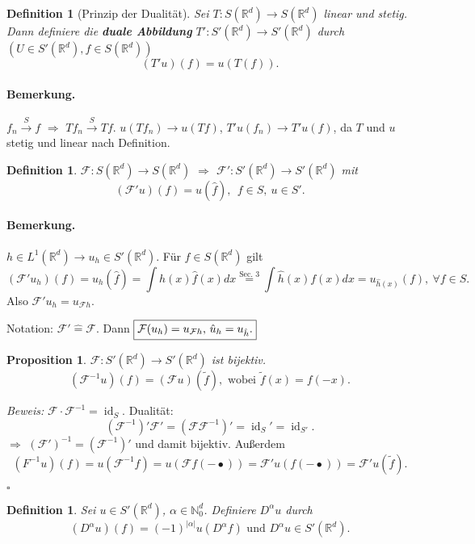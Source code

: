 \documentclass[12pt,a4paper,titlepage]{scrartcl}
\newtheorem{Definition}[Satz]{Definition}
\newtheorem{Prop}[Satz]{Proposition}
\DeclareMathOperator{\id}{id}
\numberwithin{equation}{section}
\newcommand{\R}{\mathbb{R}} %
\newcommand{\N}{\mathbb{N}} %
\newcommand{\f}{\hat{f}}
\newcommand{\F}{\mathcal{F}}
\newcommand{\m}{\cdot}
\newcommand{\Bew}{\emph{Beweis: }}
\newcommand{\qed}{\begin{flushright}
		$\square$
	\end{flushright}}
\begin{document}
	\begin{Definition}[Prinzip der Dualität]
		Sei $T:S(\R^d)\rightarrow S(\R^d)$ linear und stetig. Dann definiere die \textbf{duale Abbildung} $T':S'(\R^d)\rightarrow S'(\R^d)$ durch $(U\in S'(\R^d), f\in S(\R^d))$
		$$(T'u)(f) = u(T(f)).$$
	\end{Definition}
	
	
	\paragraph{Bemerkung.} $f_n\overset{S}{\rightarrow} f$ $\Rightarrow$ $Tf_n\overset{S}{\rightarrow} Tf$. $u(Tf_n) \rightarrow u(Tf)$, $T'u(f_n)\rightarrow T'u(f)$, da $T$ und $u$ stetig und linear nach Definition.
	
	\begin{Definition}
		$\F:S(\R^d)\rightarrow S(\R^d)$ $\Rightarrow$ $\F':S'(\R^d)\rightarrow S'(\R^d)$ mit 
		$$(\F'u)(f) = u(\f),~~ f\in S,~ u\in S'.$$
	\end{Definition}
	
	\paragraph{Bemerkung.} $h\in L^1(\R^d)\rightarrow u_h\in S'(\R^d)$. Für $f\in S(\R^d)$ gilt 
	$$(\F'u_h)(f) = u_h(\f) = \int h(x) \f(x) dx \overset{\text{Sec. 3}}{=}\int \hat{h}(x)f(x) dx = u_{\hat h (x)}(f),~\forall f\in S.$$
	Also $\F'u_h = u_{\F h}$.
	
	Notation: $\F'\hat{=}\F$. Dann $\boxed{\F(u_h)=u_{\F h}$, $\hat{u}_h = u_{\hat h}.}$
	
	\begin{Prop}
		$\F: S'(\R^d)\rightarrow S'(\R^d)$ ist bijektiv.
		$$(\F^{-1}u)(f) = (\F u)(\tilde{f}), \text{ wobei } \tilde{f}(x) = f(-x).$$
	\end{Prop}
	
	\Bew $\F\m\F^{-1} = \id_S$. Dualität: 
	$$(\F^{-1})'\F' = (\F\F^{-1})' = \id_S'= \id_{S'}.$$
	$\Rightarrow$ $(\F')^{-1} = (\F^{-1})'$ und damit bijektiv. Außerdem 
	$$(F^{-1}u)(f) = u(\F^{-1}f) = u(\F f(-\bullet)) =  \F'u(f(-\bullet)) = \F'u(\tilde{f}).$$
	\qed
	
	
	\begin{Definition}
		Sei $u\in S'(\R^d)$, $\alpha\in \N_0^d$. Definiere $D^\alpha u$ durch
		$$(D^\alpha u)(f) = (-1)^{|\alpha|}u(D^\alpha f)\text{ und } D^\alpha u\in S'(\R^d).$$
	\end{Definition}
	
\end{document}
